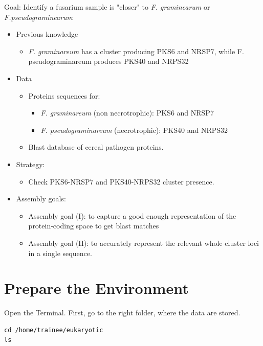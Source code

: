 \begin{information}
Goal: Identify a fusarium sample is "closer" to \textit{F. graminearum} or \textit{F.pseudograminearum}
\begin{itemize}
	\item Previous knowledge
		\begin{itemize}
		\item \textit{F. graminareum} has a cluster producing PKS6 and NRSP7, while F. pseudograminareum produces PKS40 and NRPS32
		\end{itemize}
	\item Data
		\begin{itemize}
		\item Proteins sequences for:
			\begin{itemize}
			\item \textit{F. graminareum} (non necrotrophic): PKS6 and NRSP7
			\item \textit{F. pseudograminareum} (necrotrophic): PKS40 and NRPS32
			\end{itemize}
		\item Blast database of cereal pathogen proteins.
		\end{itemize}
	\item Strategy:
		\begin{itemize}
		\item Check PKS6-NRSP7 and PKS40-NRPS32 cluster presence.
		\end{itemize}
	\item Assembly goals:
		\begin{itemize}
		\item Assembly goal (I): to capture a good enough representation of the protein-coding space to get blast matches
		\item Assembly goal (II): to accurately represent the relevant whole cluster loci in a single sequence.
		\end{itemize}
\end{itemize}

\end{information}

\section{Prepare the Environment}
\begin{steps}
Open the Terminal.
First, go to the right folder, where the data are stored.
\begin{lstlisting}
cd /home/trainee/eukaryotic
ls
\end{lstlisting}
\end{steps}

